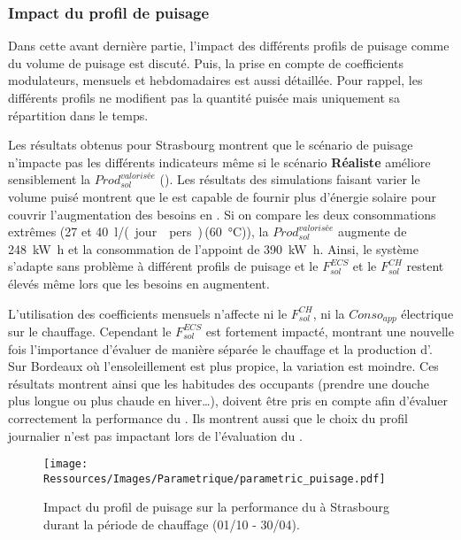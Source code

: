 \subsubsection{Impact du profil de puisage} %
\label{ssub:impact_du_profil_de_puisage}
Dans cette avant dernière partie, l’impact des différents profils de puisage comme du
volume de puisage est discuté. Puis, la prise en compte de coefficients modulateurs,
mensuels et hebdomadaires est aussi détaillée. Pour rappel, les différents profils ne
modifient pas la quantité puisée mais uniquement sa répartition dans le temps.

Les résultats obtenus pour Strasbourg montrent que le scénario de puisage n’impacte pas
les différents indicateurs même si le scénario \textbf{Réaliste} améliore sensiblement la
$Prod_{sol}^{valorisée}$ (). Les résultats des
simulations faisant varier le volume puisé montrent que le  est capable de
fournir plus d’énergie solaire pour couvrir l’augmentation des besoins
en . Si on compare les deux consommations extrêmes (\num{27} et
\SI{40}{\litre/(jour\period pers)}\,(\SI{60}{\celsius})), la $Prod_{sol}^{valorisée}$
augmente de \SI{248}{\kilo\watt\hour} et la consommation de l’appoint de \SI{390}{\kilo\watt\hour}.
Ainsi, le système s’adapte sans problème à différent profils de puisage et le
$F_{sol}^{ECS}$ et le $F_{sol}^{CH}$ restent élevés même lors que les besoins en  augmentent.

L’utilisation des coefficients mensuels n’affecte ni le $F_{sol}^{CH}$, ni la $Conso_{app}$
électrique sur le chauffage. Cependant le $F_{sol}^{ECS}$ est fortement impacté, montrant une
nouvelle fois l’importance d’évaluer de manière séparée le chauffage et la production
d’. Sur Bordeaux où l’ensoleillement est plus propice, la variation est moindre. Ces
résultats montrent ainsi que les habitudes des occupants (prendre une douche plus longue
ou plus chaude en hiver\dots), doivent être pris en compte afin d’évaluer correctement la
performance du . Ils montrent aussi que le choix du profil journalier n’est pas impactant lors
de l’évaluation du .

\begin{figure}
    \centering
    \texttt{[image: Ressources/Images/Parametrique/parametric\_puisage.pdf]}
    \caption[Impact du profil de puisage sur la performance du ]
            {Impact du profil de puisage sur la performance
             du  à Strasbourg durant la période de chauffage (01/10 - 30/04).}
    \label{fig:impact_profil_puisage}
\end{figure}


